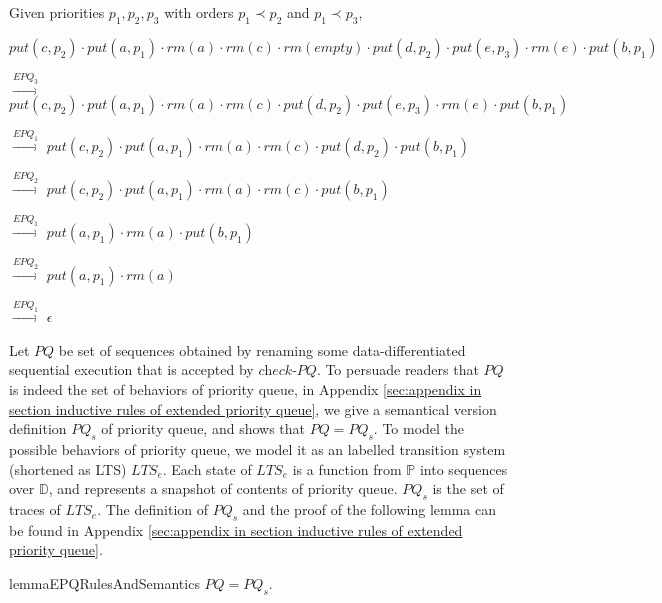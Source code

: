 \begin{example}\label{example:generate extended priority queue executions}
Given priorities $p_1,p_2,p_3$ with orders $p_1 \prec p_2$ and $p_1 \prec p_3$,

\noindent $\textit{put}(c,p_2) \cdot \textit{put}(a,p_1) \cdot \textit{rm}(a) \cdot \textit{rm}(c) \cdot \textit{rm}(\textit{empty}) \cdot \textit{put}(d,p_2) \cdot \textit{put}(e,p_3) \cdot \textit{rm}(e) \cdot \textit{put}(b,p_1)$

$\xrightarrow{\textit{EPQ}_3}$ $\textit{put}(c,p_2) \cdot \textit{put}(a,p_1) \cdot \textit{rm}(a) \cdot \textit{rm}(c) \cdot \textit{put}(d,p_2) \cdot \textit{put}(e,p_3) \cdot \textit{rm}(e) \cdot \textit{put}(b,p_1)$

$\xrightarrow{\textit{EPQ}_1}$ $\textit{put}(c,p_2) \cdot \textit{put}(a,p_1) \cdot \textit{rm}(a) \cdot \textit{rm}(c) \cdot \textit{put}(d,p_2) \cdot \textit{put}(b,p_1)$

$\xrightarrow{\textit{EPQ}_2}$ $\textit{put}(c,p_2) \cdot \textit{put}(a,p_1) \cdot \textit{rm}(a) \cdot \textit{rm}(c) \cdot \textit{put}(b,p_1)$

$\xrightarrow{\textit{EPQ}_1}$ $\textit{put}(a,p_1) \cdot \textit{rm}(a) \cdot \textit{put}(b,p_1)$

$\xrightarrow{\textit{EPQ}_2}$ $\textit{put}(a,p_1) \cdot \textit{rm}(a)$

$\xrightarrow{\textit{EPQ}_1}$ $\epsilon$
\end{example}


Let $\textit{PQ}$ be set of sequences obtained by renaming some data-differentiated sequential execution that is accepted by $\textit{check-PQ}$. To persuade readers that $\textit{PQ}$ is indeed the set of behaviors of priority queue, in Appendix \ref{sec:appendix in section inductive rules of extended priority queue}, we give a semantical version definition $\textit{PQ}_s$ of priority queue, and shows that $\textit{PQ} = \textit{PQ}_s$. To model the possible behaviors of priority queue, we model it as an labelled transition system (shortened as LTS) $\textit{LTS}_e$. Each state of $\textit{LTS}_e$ is a function from $\mathbb{P}$ into sequences over $\mathbb{D}$, and represents a snapshot of contents of priority queue. $\textit{PQ}_s$ is the set of traces of $\textit{LTS}_e$. The definition of $\textit{PQ}_s$ and the proof of the following lemma can be found in Appendix \ref{sec:appendix in section inductive rules of extended priority queue}.

\begin{restatable}{lemma}{EPQRulesAndSemantics}
\label{lemma:EPQ rules and semantics}
$\textit{PQ} = \textit{PQ}_s$.
\end{restatable}

